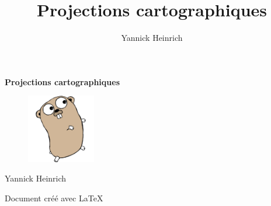 \documentclass[a4paper,10pt,oneside]{report}
\title{\Huge \textbf{Projections cartographiques}}
\author{Yannick Heinrich}
\begin{document}
\begin{center}
\Huge \textbf{Projections cartographiques}
\end{center}

\begin{figure}[h]
  \centering
  \vspace{0.5cm}
  \includegraphics[height=3cm]{img/gophercolor.png}
  \vspace{0.5cm}
\end{figure}
%	
%
%

\begin{center}
Yannick Heinrich
\end{center}
	
\begin{center}
Document créé avec \LaTeX{}  \\ %

\paragraph{}

\end{center}

\newpage{}

\tableofcontents
\printnomenclature


%
%
%
%
%
\end{document}
